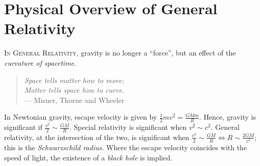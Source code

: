 { %
\renewcommand{\thechapter}{\arabic{chapter}} %
\chapter{Physical Overview of General Relativity}
}

\textsc{In General Relativity}, gravity is no longer a ``force'', but an effect of the \emph{curvature of spacetime}.

\begin{quote}
	\emph{Space tells matter how to move; \\
	\hspace*{1em} Matter tells space how to curve.} \\
	\hspace*{2em} --- Misner, Thorne and Wheeler
\end{quote}

\begin{center}
\end{center}

\noindent
In Newtonian gravity, escape velocity is given by $\frac12mv^2 = \frac{GMm}{R}$.
Hence, gravity is significant if $\frac{v^2}{2} \sim \frac{GM}{R}$.
Special relativity is significant when $v^2 \sim c^2$.
General relativity, at the intersection of the two, is significant when $\frac{c^2}{2} \sim \frac{GM}{R} \iff R \sim \frac{2GM}{c^2}$; this is the \emph{Schwarzschild radius}.
Where the escape velocity coincides with the speed of light, the existence of a \emph{black hole} is implied.